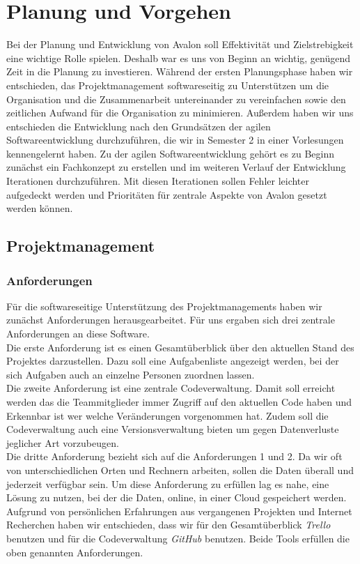 
\chapter{Planung und Vorgehen}

Bei der Planung und Entwicklung von Avalon soll Effektivität und Zielstrebigkeit eine wichtige Rolle spielen. Deshalb war es uns von Beginn an wichtig, genügend Zeit in die Planung zu investieren. Während der ersten Planungsphase haben wir entschieden, das Projektmanagement softwareseitig zu Unterstützen um die Organisation und die  Zusammenarbeit untereinander zu vereinfachen sowie den zeitlichen Aufwand für die Organisation zu minimieren. Außerdem haben wir uns entschieden die Entwicklung nach den Grundsätzen der agilen Softwareentwicklung durchzuführen, die wir in Semester 2 in einer Vorlesungen kennengelernt haben. Zu der agilen Softwareentwicklung gehört es zu Beginn zunächst ein Fachkonzept zu erstellen und im weiteren Verlauf der Entwicklung Iterationen durchzuführen. Mit diesen Iterationen sollen Fehler leichter aufgedeckt werden und Prioritäten für zentrale Aspekte von Avalon gesetzt werden können.

\section{Projektmanagement}

\subsection{Anforderungen}

Für die softwareseitige Unterstützung des Projektmanagements haben wir zunächst Anforderungen herausgearbeitet. Für uns ergaben sich drei zentrale Anforderungen an diese Software. \\
Die erste Anforderung ist es einen Gesamtüberblick über den aktuellen Stand des Projektes darzustellen. Dazu soll eine Aufgabenliste angezeigt werden, bei der sich Aufgaben auch an einzelne Personen zuordnen lassen.\\
Die zweite Anforderung ist eine zentrale Codeverwaltung. Damit soll erreicht werden das die Teammitglieder immer Zugriff auf den aktuellen Code haben und Erkennbar ist wer welche Veränderungen vorgenommen hat. Zudem soll die Codeverwaltung auch eine Versionsverwaltung bieten um gegen Datenverluste jeglicher Art vorzubeugen.\\
Die dritte Anforderung bezieht sich auf die Anforderungen 1 und 2. Da wir oft von unterschiedlichen Orten und Rechnern arbeiten, sollen die Daten überall und jederzeit verfügbar sein. Um diese Anforderung zu erfüllen lag es nahe, eine Lösung zu nutzen, bei der die Daten, online, in einer Cloud gespeichert werden.
Aufgrund von persönlichen Erfahrungen aus vergangenen Projekten und Internet Recherchen haben wir entschieden, dass wir für den Gesamtüberblick \textit{Trello} benutzen und für die Codeverwaltung \textit{GitHub} benutzen. Beide Tools erfüllen die oben genannten Anforderungen.


